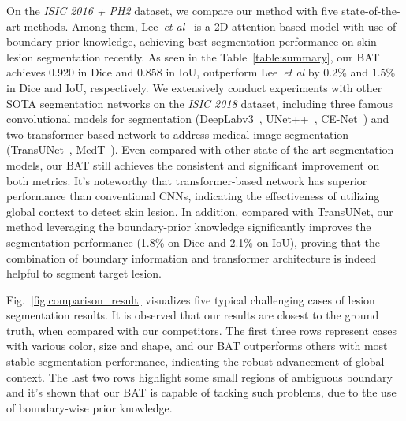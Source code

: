 \documentclass[runningheads]{paper478-llncs}
\begin{document}
On the \emph{ISIC 2016 + PH2} dataset, we compare our method with five state-of-the-art methods. Among them, Lee~\textit{et al}~\cite{9157193} is a 2D attention-based model with use of boundary-prior knowledge, achieving best segmentation performance on skin lesion segmentation recently. As seen in the Table~\ref{table:summary}, our BAT achieves 0.920 in Dice and 0.858 in IoU, outperform Lee~\textit{et al} by 0.2\% and 1.5\% in Dice and IoU, respectively.
We extensively conduct experiments with other SOTA segmentation networks on the \emph{ISIC 2018} dataset, including three famous convolutional models for segmentation (DeepLabv3~\cite{chen2017rethinking}, UNet++~\cite{zhou2018unetpp}, CE-Net~\cite{gu2019cenet}) and two transformer-based network to address medical image segmentation (TransUNet~\cite{chen2021transunet}, MedT~\cite{valanarasu2021medical}). Even compared with other state-of-the-art segmentation models, our BAT still achieves the consistent and significant improvement on both metrics.
It's noteworthy that transformer-based network has superior performance than conventional CNNs, indicating the effectiveness of utilizing global context to detect skin lesion. 
In addition, compared with TransUNet, our method leveraging the boundary-prior knowledge significantly improves the segmentation performance (1.8\% on Dice and 2.1\% on IoU), proving that the combination of boundary information and transformer architecture is indeed helpful to segment target lesion.


Fig.~\ref{fig:comparison_result} visualizes five typical challenging cases of lesion segmentation results. It is observed that our results are closest to the ground truth, when compared with our competitors. The first three rows represent cases with various color, size and shape, and our BAT outperforms others with most stable segmentation performance, indicating the robust advancement of global context. The last two rows highlight some small regions of ambiguous boundary and it's shown that our BAT is capable of tacking such problems, due to the use of boundary-wise prior knowledge.
\end{document}
